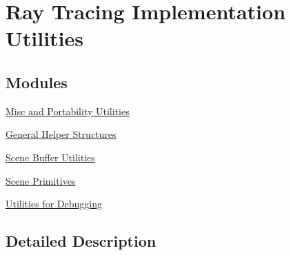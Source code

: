 \hypertarget{group__g1}{}\section{Ray Tracing Implementation Utilities}
\label{group__g1}
\subsection*{Modules}
\begin{DoxyCompactItemize}
\item 
\hyperlink{group__g15}{Misc and Portability Utilities}
\item 
\hyperlink{group__g12}{General Helper Structures}
\item 
\hyperlink{group__g13}{Scene Buffer Utilities}
\item 
\hyperlink{group__g11}{Scene Primitives}
\item 
\hyperlink{group__g16}{Utilities for Debugging}
\end{DoxyCompactItemize}


\subsection{Detailed Description}
